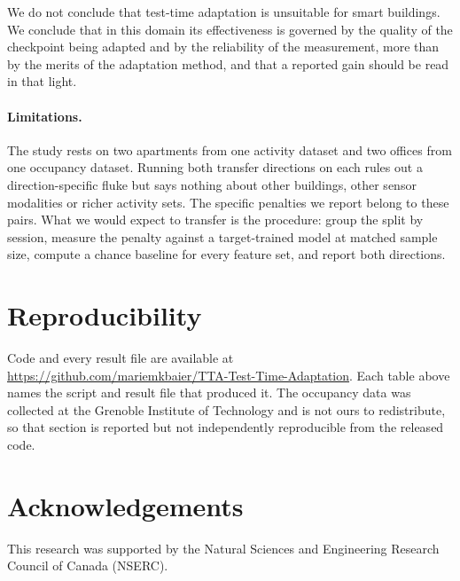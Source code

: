 \documentclass[a4paper,fleqn]{cas-dc}
\begin{document}
We do not conclude that test-time adaptation is unsuitable for smart buildings. We conclude
that in this domain its effectiveness is governed by the quality of the checkpoint being
adapted and by the reliability of the measurement, more than by the merits of the
adaptation method, and that a reported gain should be read in that light.

\paragraph{Limitations.} The study rests on two apartments from one activity dataset and
two offices from one occupancy dataset. Running both transfer directions on each rules out
a direction-specific fluke but says nothing about other buildings, other sensor modalities
or richer activity sets. The specific penalties we report belong to these pairs. What we
would expect to transfer is the procedure: group the split by session, measure the penalty
against a target-trained model at matched sample size, compute a chance baseline for every
feature set, and report both directions.

\section*{Reproducibility}

Code and every result file are available at
\url{https://github.com/mariemkbaier/TTA-Test-Time-Adaptation}. Each table above names the
script and result file that produced it. The occupancy data was collected at the Grenoble
Institute of Technology and is not ours to redistribute, so that section is reported but
not independently reproducible from the released code.

\section*{Acknowledgements}

This research was supported by the Natural Sciences and Engineering Research Council of
Canada (NSERC).
\end{document}
